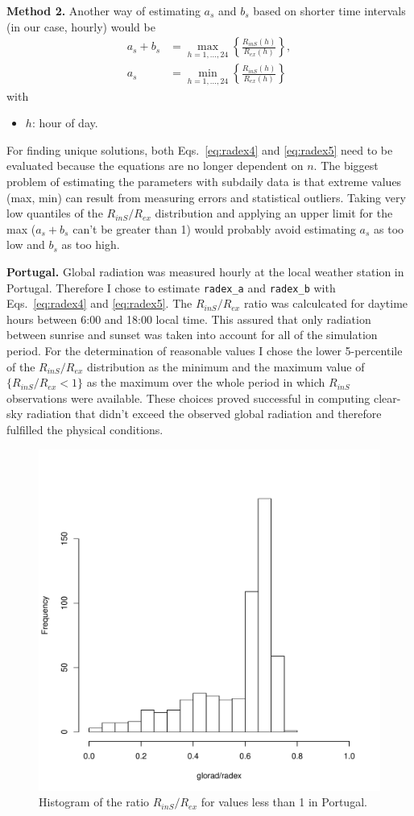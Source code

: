 \documentclass{scrreprt}
\newenvironment{denseitem}{
  \begin{itemize}
    \setlength{\itemsep}{0pt}
    \setlength{\parskip}{0pt}
    \setlength{\parsep}{0pt}
}{
  \end{itemize}
}
\begin{document}
\textbf{Method 2.}
Another way of estimating $a_s$ and $b_s$ based on shorter time intervals (in our case, hourly) would be
\begin{align}
  a_s + b_s &= \max_{h = 1, ..., 24} \left \{ \frac{R_{inS} (h)}{R_{ex} (h)} \right \}, \label{eq:radex4} \\
  a_s &= \min_{h = 1, ..., 24} \left \{ \frac{R_{inS} (h)}{R_{ex} (h)} \right \} \label{eq:radex5}
\end{align}
%
with
\begin{denseitem}
  \item[] $h$: hour of day.
\end{denseitem}
%
For finding unique solutions, both Eqs.~\eqref{eq:radex4} and \eqref{eq:radex5} need to be evaluated because the equations are no longer dependent on $n$.
The biggest problem of estimating the parameters with subdaily data is that extreme values (max, min) can result from measuring errors and statistical outliers.
Taking very low quantiles of the $R_{inS}/R_{ex}$ distribution and applying an upper limit for the max ($a_s + b_s$ can't be greater than 1) would probably avoid estimating $a_s$ as too low and $b_s$ as too high.

\textbf{Portugal.}
Global radiation was measured hourly at the local weather station in Portugal.
Therefore I chose to estimate \verb!radex_a! and \verb!radex_b! with Eqs.~\eqref{eq:radex4} and \eqref{eq:radex5}.
The $R_{inS}/R_{ex}$ ratio was calculcated for daytime hours between 6:00 and 18:00 local time.
This assured that only radiation between sunrise and sunset was taken into account for all of the simulation period.
For the determination of reasonable values I chose the lower 5-percentile of the $R_{inS}/R_{ex}$ distribution as the minimum and the maximum value of $\{R_{inS}/R_{ex} < 1\}$ as the maximum over the whole period in which $R_{inS}$ observations were available.
These choices proved successful in computing clear-sky radiation that didn't exceed the observed global radiation and therefore fulfilled the physical conditions.

\begin{figure}[ht]
  \centering
  \includegraphics[width=0.5\hsize]{./plot_radex1.pdf}
  \caption{Histogram of the ratio $R_{inS}/R_{ex}$ for values less than 1 in Portugal.}
  \label{fig:portugal_radex1}
\end{figure}
\end{document}
